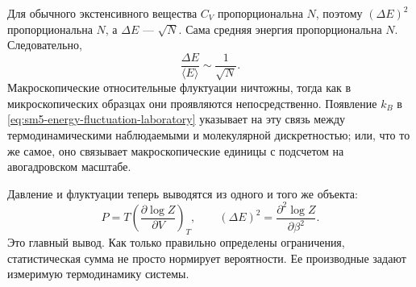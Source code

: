 \begin{classroomqa}
\end{classroomqa}

Для обычного экстенсивного вещества \(C_V\) пропорциональна \(N\), поэтому
\((\Delta E)^2\) пропорциональна \(N\), а \(\Delta E\) —
\(\sqrt{N}\). Сама средняя энергия пропорциональна \(N\). Следовательно,
\begin{equation}
 \frac{\Delta E}{\langle E\rangle}\sim\frac{1}{\sqrt{N}}.
 \label{eq:sm5-relative-fluctuation-scaling}
\end{equation}
Макроскопические относительные флуктуации ничтожны, тогда как в микроскопических образцах они проявляются непосредственно. Появление \(k_B\) в
\eqref{eq:sm5-energy-fluctuation-laboratory} указывает на эту связь между
термодинамическими наблюдаемыми и молекулярной дискретностью; или, что то же самое, оно связывает макроскопические единицы с подсчетом на авогадровском масштабе.

Давление и флуктуации теперь выводятся из одного и того же объекта:
\[
 P=T\left(\frac{\partial\log Z}{\partial V}\right)_T,
 \qquad
 (\Delta E)^2=\frac{\partial^2\log Z}{\partial\beta^2}.
\]
Это главный вывод. Как только правильно определены ограничения, статистическая сумма не просто нормирует вероятности. Ее производные задают измеримую термодинамику системы.
